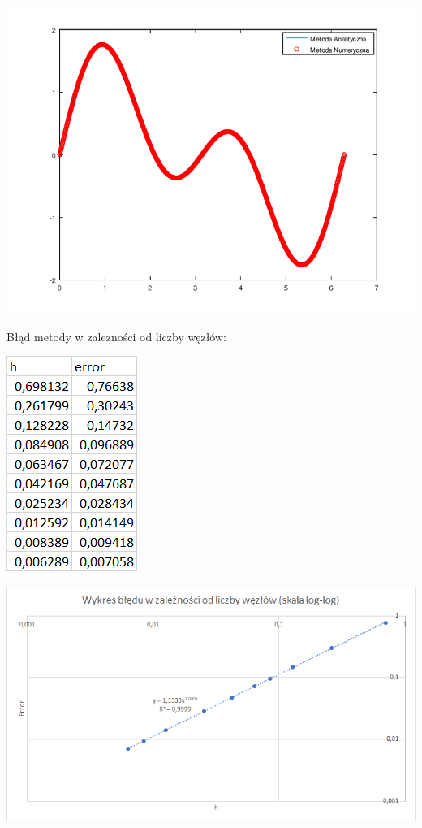 {\centering

\includegraphics{Lab3/charts/zad1/lab_3_1_n_1000.png}

}

\newpage

Błąd metody w zalezności od liczby węzłów:

\includegraphics{Lab3/charts/zad1/error_dane.png}

\includegraphics{Lab3/charts/zad1/error.png}

